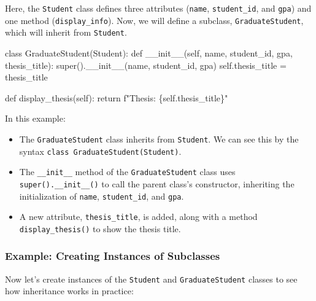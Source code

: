 \documentclass[
  letterpaper,
  DIV=11,
  numbers=noendperiod]{scrreprt}
\newenvironment{Shaded}{\begin{snugshade}}{\end{snugshade}}
\newcommand{\BuiltInTok}[1]{\textcolor[rgb]{0.00,0.23,0.31}{#1}}
\newcommand{\ControlFlowTok}[1]{\textcolor[rgb]{0.00,0.23,0.31}{#1}}
\newcommand{\FunctionTok}[1]{\textcolor[rgb]{0.28,0.35,0.67}{#1}}
\newcommand{\KeywordTok}[1]{\textcolor[rgb]{0.00,0.23,0.31}{#1}}
\newcommand{\NormalTok}[1]{\textcolor[rgb]{0.00,0.23,0.31}{#1}}
\newcommand{\OperatorTok}[1]{\textcolor[rgb]{0.37,0.37,0.37}{#1}}
\newcommand{\SpecialCharTok}[1]{\textcolor[rgb]{0.37,0.37,0.37}{#1}}
\newcommand{\SpecialStringTok}[1]{\textcolor[rgb]{0.13,0.47,0.30}{#1}}
\newcommand{\VariableTok}[1]{\textcolor[rgb]{0.07,0.07,0.07}{#1}}
\providecommand{\tightlist}{%
  \setlength{\itemsep}{0pt}\setlength{\parskip}{0pt}}\usepackage{longtable,booktabs,array}
\begin{document}
Here, the \texttt{Student} class defines three attributes
(\texttt{name}, \texttt{student\_id}, and \texttt{gpa}) and one method
(\texttt{display\_info}). Now, we will define a subclass,
\texttt{GraduateStudent}, which will inherit from \texttt{Student}.

\begin{Shaded}
\begin{Highlighting}[]
\KeywordTok{class}\NormalTok{ GraduateStudent(Student):}
    \KeywordTok{def} \FunctionTok{\_\_init\_\_}\NormalTok{(}\VariableTok{self}\NormalTok{, name, student\_id, gpa, thesis\_title):}
        \BuiltInTok{super}\NormalTok{().}\FunctionTok{\_\_init\_\_}\NormalTok{(name, student\_id, gpa)}
        \VariableTok{self}\NormalTok{.thesis\_title }\OperatorTok{=}\NormalTok{ thesis\_title}

    \KeywordTok{def}\NormalTok{ display\_thesis(}\VariableTok{self}\NormalTok{):}
        \ControlFlowTok{return} \SpecialStringTok{f"Thesis: }\SpecialCharTok{\{}\VariableTok{self}\SpecialCharTok{.}\NormalTok{thesis\_title}\SpecialCharTok{\}}\SpecialStringTok{"}
\end{Highlighting}
\end{Shaded}

In this example:

\begin{itemize}
\tightlist
\item
  The \texttt{GraduateStudent} class inherits from \texttt{Student}. We
  can see this by the syntax \texttt{class\ GraduateStudent(Student)}.
\item
  The \texttt{\_\_init\_\_} method of the \texttt{GraduateStudent} class
  uses \texttt{super().\_\_init\_\_()} to call the parent class's
  constructor, inheriting the initialization of \texttt{name},
  \texttt{student\_id}, and \texttt{gpa}.
\item
  A new attribute, \texttt{thesis\_title}, is added, along with a method
  \texttt{display\_thesis()} to show the thesis title.
\end{itemize}

\hypertarget{example-creating-instances-of-subclasses}{%
\subsubsection{Example: Creating Instances of
Subclasses}\label{example-creating-instances-of-subclasses}}

Now let's create instances of the \texttt{Student} and
\texttt{GraduateStudent} classes to see how inheritance works in
practice:
\end{document}

